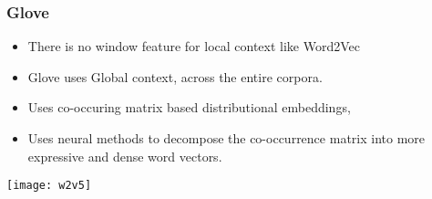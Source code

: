 




\begin{frame}[fragile]\frametitle{Glove}
  \begin{itemize}
	\item There is no window feature for local context like Word2Vec
	\item Glove uses Global context, across the entire corpora.
	\item Uses co-occuring matrix based distributional embeddings,
	\item Uses neural methods to decompose the co-occurrence matrix into more expressive and dense word vectors.
  \end{itemize}
  
\begin{center}
\texttt{[image: w2v5]}
\end{center}
  
\end{frame}

